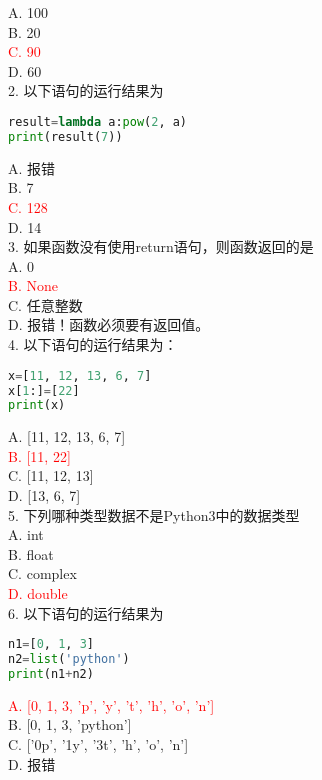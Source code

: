 \documentclass[6pt]{article}
\begin{document}
A. 100\\
B. 20\\
\textcolor{red}{C. 90}\\
D. 60\\

2. 以下语句的运行结果为\\

\begin{lstlisting}[language=Python]
result=lambda a:pow(2, a)
print(result(7))
\end{lstlisting}
A. 报错\\
B. 7\\
\textcolor{red}{C. 128}\\
D. 14\\

3. 如果函数没有使用return语句，则函数返回的是\\

A. 0\\
\textcolor{red}{B. None}\\
C. 任意整数\\
D. 报错！函数必须要有返回值。\\

4. 以下语句的运行结果为：\\

\begin{lstlisting}[language=Python]
x=[11, 12, 13, 6, 7]
x[1:]=[22]
print(x) 
\end{lstlisting}
A. [11, 12, 13, 6, 7]\\
\textcolor{red}{B. [11, 22]}\\
C. [11, 12, 13]\\
D. [13, 6, 7]\\

5. 下列哪种类型数据不是Python3中的数据类型\\

A. int\\
B. float\\
C. complex\\
\textcolor{red}{D. double}\\

6. 以下语句的运行结果为\\

\begin{lstlisting}[language=Python]
n1=[0, 1, 3]
n2=list('python')
print(n1+n2)
\end{lstlisting}
\textcolor{red}{A. [0, 1, 3, 'p', 'y', 't', 'h', 'o', 'n']}\\
B. [0, 1, 3, ’python’]\\
C. ['0p', '1y', '3t', 'h', 'o', 'n']\\
D. 报错\\
\end{document}
